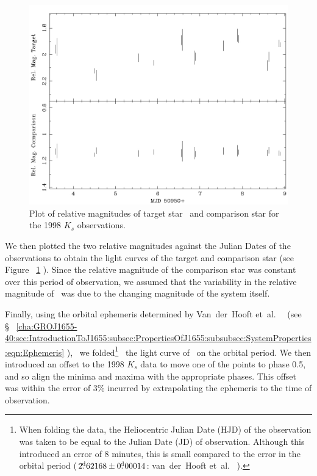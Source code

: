 \begin{figure}[!htb]
\begin{center}
\includegraphics[width=5.0in]{kctio98prefolded}
\caption{%
Plot of relative magnitudes of target star \groj\ and comparison star
for the 1998 $K_s$ observations. %
}\label{cha:lightcurve:sec:Photometry:subsec:RelativePhotometry:fig:kctio98prefolded}
\end{center}
\end{figure}

\vspace{\myparskip}

We then plotted the two relative magnitudes against the Julian
Dates of the observations to obtain the light curves of the target and
comparison star (see Figure~%
\ref{cha:lightcurve:sec:Photometry:subsec:RelativePhotometry:fig:kctio98prefolded}%
). Since the relative magnitude of the comparison star was constant over this period of observation, we assumed that the variability in the relative magnitude of \groj\ was due to the changing magnitude of the system itself. %

\vspace{\myparskip}

Finally, using the orbital
ephemeris determined by Van~der~Hooft et~al.\ %
\citeyear{VanDerHooft_et_al.:1998}%
\ (see \S~%
\vref{cha:GROJ1655-40:sec:IntroductionToJ1655:subsec:PropertiesOfJ1655:subsubsec:SystemProperties:eqn:Ephemeris}%
),%
\ we folded\footnote{\label{cha:lightcurve:sec:Photometry:subsec:RelativePhotometry:foot:MJD}%
When folding the data, the Heliocentric Julian Date (HJD) of the
observation was taken to be equal to the Julian Date (JD) of
observation. Although this introduced an error of 8 minutes, this is
small compared to the error in the orbital period ($2\hbox{$.\!\!^{\rm d}$}62168\pm0\hbox{$.\!\!^{\rm d}$}00014$:
van~der~Hooft et~al.\ %
%
).}%
\ the light curve of \groj\ on the orbital period. We then introduced
an offset to the 1998 $K_s$ data to move one of the points to phase
0.5, and so align the minima and maxima with the appropriate
phases. This offset was within the error of 3\% incurred by
extrapolating the ephemeris to the time of observation. %

